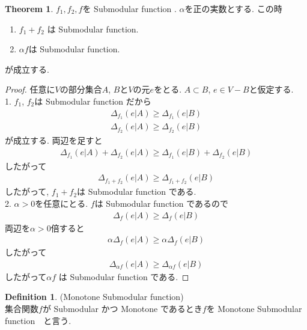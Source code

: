 \documentclass[11pt, a4paper, dvipdfmx]{jsarticle}
\theoremstyle{definition}
\newtheorem{Definition+}[Axiom+]{Definition}
\newtheorem{Theorem+}[Axiom+]{Theorem}
\begin{document}
\begin{Theorem+}
    $f_{1}, f_{2}, f$を Submodular function . $\alpha$を正の実数とする. この時
    \begin{enumerate}
        \item $f_{1} + f_{2} $ は Submodular function.
        \item $\alpha f$は Submodular function.
    \end{enumerate}
    が成立する.
    \begin{proof}
        任意に$V$の部分集合$A$, $B$と$V$の元$e$をとる. $A\subset B$, $e\in V - B$と仮定する.\\
        1. $f_{1}$, $f_{2}$は Submodular function だから
        \begin{align*}
            \Delta_{f_{1}}(e|A)\geq \Delta_{f_{1}}(e|B)
        \end{align*}
        \begin{align*}
            \Delta_{f_{2}}(e|A)\geq \Delta_{f_{2}}(e|B)
        \end{align*}
        が成立する. 両辺を足すと
        \begin{align*}
            \Delta_{f_{1}}(e|A) + \Delta_{f_{2}}(e|A)\geq \Delta_{f_{1}}(e|B) + \Delta_{f_{2}}(e|B)
        \end{align*}
        したがって
        \begin{align*}
            \Delta_{f_{1} + f_{2}}(e|A)\geq \Delta_{f_{1} + f_{2}}(e|B)
        \end{align*}
        したがって, $f_{1} + f_{2}$は Submodular function である.\\
        2. $\alpha > 0$を任意にとる. $f$は Submodular function であるので
        \begin{align*}
            \Delta_{f}(e|A)\geq \Delta_{f}(e|B)
        \end{align*}
        両辺を$\alpha > 0$倍すると
        \begin{align*}
            \alpha\Delta_{f}(e|A)\geq \alpha\Delta_{f}(e|B)
        \end{align*}
        したがって
        \begin{align*}
            \Delta_{\alpha f}(e|A)\geq \Delta_{\alpha f}(e|B)
        \end{align*}
        したがって$\alpha f$ は Submodular function である.
     \end{proof}
\end{Theorem+}
\begin{Definition+}(Monotone Submodular function)\\
    集合関数$f$が Submodular かつ Monotone であるとき$f$を Monotone Submodular function　と言う.
\end{Definition+}
\end{document}
